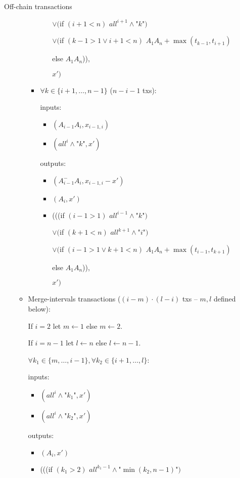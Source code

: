 \begin{notitlebox}{Off-chain transactions}
\begin{itemize}
\begin{itemize}
\begin{itemize}
\begin{itemize}
          $\vee ($if $(i+1 < n)$ $\mathit{all}^{i+1} \wedge
          \texttt{"}k\texttt{"})$

          $\vee ($if $(k-1 > 1 \vee i+1 < n)$ $A_1 A_n+\max{(t_{k-1}, t_{i+1})}$

          \:\:\: else $A_1 A_n$)),

          $x')$
        \end{itemize}
        \item $\forall k \in \{i+1, \dots, n-1\}$ ($n-i-1$ txs):

        inputs:
        \begin{itemize}
          \item $(A_{i-1} A_i, x_{i-1,i})$
          \item $(\mathit{all}^i \wedge \texttt{"}k\texttt{"}, x')$
        \end{itemize}
        outputs:
        \begin{itemize}
          \item $(A_{i-1}^- A_i, x_{i-1,i} - x')$
          \item $(A_i, x')$
          \item (((if $(i-1 > 1)$ $\mathit{all}^{i-1} \wedge \texttt{"}k\texttt{"})$

          $\vee ($if $(k+1 < n)$ $\mathit{all}^{k+1} \wedge \texttt{"}i\texttt{"})$

          $\vee ($if $(i-1 > 1 \vee k+1 < n)$ $A_1 A_n+\max{(t_{i-1}, t_{k+1})}$

          \:\:\: else $A_1 A_n$)),

          $x')$
        \end{itemize}
      \end{itemize}
      \item Merge-intervals transactions ($(i-m)\cdot(l-i)$ txs -- $m, l$
      defined below):

      If $i = 2$ let $m \gets 1$ else $m \gets 2$.

      If $i = n-1$ let $l \gets n$ else $l \gets n-1$.

      $\forall k_1 \in \{m, \dots, i-1\}, \forall k_2 \in \{i+1, \dots, l\}$:

      inputs:
      \begin{itemize}
        \item $(\mathit{all}^i \wedge \texttt{"}k_1\texttt{"}, x')$
        \item $(\mathit{all}^i \wedge \texttt{"}k_2\texttt{"}, x')$
      \end{itemize}
      outputs:
      \begin{itemize}
        \item $(A_i, x')$
        \item (((if $(k_1 > 2)$ $\mathit{all}^{k_1-1} \wedge
        \texttt{"}\min{(k_2, n-1)}\texttt{"})$


\end{itemize}
\end{itemize}
\end{itemize}
\end{notitlebox}
